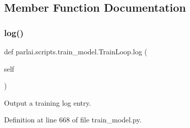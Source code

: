 \subsection{Member Function Documentation}
\mbox{\label{classparlai_1_1scripts_1_1train__model_1_1TrainLoop_a8ef64c11f101d087ceb83d21621b9665}} 
\subsubsection{\texorpdfstring{log()}{log()}}
{\footnotesize\ttfamily def parlai.\+scripts.\+train\+\_\+model.\+Train\+Loop.\+log (\begin{DoxyParamCaption}\item[{}]{self }\end{DoxyParamCaption})}

\begin{DoxyVerb}Output a training log entry.
\end{DoxyVerb}
 

Definition at line 668 of file train\+\_\+model.\+py.


